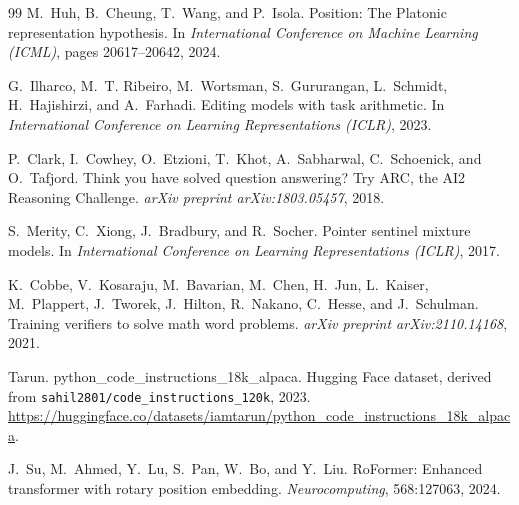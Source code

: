 \documentclass[11pt]{article}
\begin{document}
\begin{thebibliography}{99}
M.~Huh, B.~Cheung, T.~Wang, and P.~Isola.
\newblock Position: The Platonic representation hypothesis.
\newblock In \emph{International Conference on Machine Learning (ICML)}, pages 20617--20642, 2024.

G.~Ilharco, M.~T. Ribeiro, M.~Wortsman, S.~Gururangan, L.~Schmidt, H.~Hajishirzi, and A.~Farhadi.
\newblock Editing models with task arithmetic.
\newblock In \emph{International Conference on Learning Representations (ICLR)}, 2023.

P.~Clark, I.~Cowhey, O.~Etzioni, T.~Khot, A.~Sabharwal, C.~Schoenick, and O.~Tafjord.
\newblock Think you have solved question answering? Try ARC, the AI2 Reasoning Challenge.
\newblock \emph{arXiv preprint arXiv:1803.05457}, 2018.

S.~Merity, C.~Xiong, J.~Bradbury, and R.~Socher.
\newblock Pointer sentinel mixture models.
\newblock In \emph{International Conference on Learning Representations (ICLR)}, 2017.

K.~Cobbe, V.~Kosaraju, M.~Bavarian, M.~Chen, H.~Jun, L.~Kaiser, M.~Plappert, J.~Tworek, J.~Hilton, R.~Nakano, C.~Hesse, and J.~Schulman.
\newblock Training verifiers to solve math word problems.
\newblock \emph{arXiv preprint arXiv:2110.14168}, 2021.

Tarun.
\newblock python\_code\_instructions\_18k\_alpaca.
\newblock Hugging Face dataset, derived from \texttt{sahil2801/code\_instructions\_120k}, 2023.
\newblock \url{https://huggingface.co/datasets/iamtarun/python_code_instructions_18k_alpaca}.

J.~Su, M.~Ahmed, Y.~Lu, S.~Pan, W.~Bo, and Y.~Liu.
\newblock RoFormer: Enhanced transformer with rotary position embedding.
\newblock \emph{Neurocomputing}, 568:127063, 2024.

\end{thebibliography}
\end{document}
